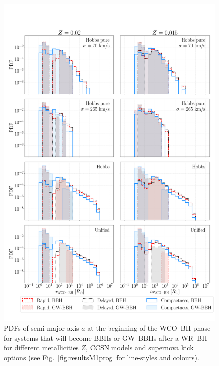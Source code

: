 \documentclass[a4paper,titlepage]{book}     	%
\begin{document}
\begin{figure}[h!]
	\centering
	\includegraphics[width=\textwidth]{./images/WRBH-apureHe.pdf}	
	\caption{PDFs of semi-major axis $a$ at the beginning of the WCO--BH phase for systems that will become BBHs or GW--BBHs after a WR--BH for different metallicities $Z$, CCSN models and supernova kick options (see Fig.\ \ref{fig:resultsM1prog} for line-styles and colours).}\label{fig:resultsWRBH-apureHe}
\end{figure}
\end{document}
